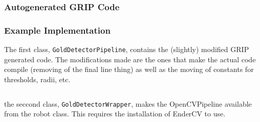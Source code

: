 \documentclass[../main.tex]{subfiles}
\begin{document}
\subsubsection{Autogenerated GRIP Code}
\subsubsection{Example Implementation}
The first class, \verb|GoldDetectorPipeline|, contains the (slightly) modified GRIP generated code. The modifications made are the ones that make the actual code compile (removing of the final line thing) as well as the moving of constants for thresholds, radii, etc.
\inputminted[linenos,breaklines,frame=lines,framesep=2mm,baselinestretch=1.2,fontsize=\footnotesize]{java}{sections/vision/code/GoldDetectorPipeline.java}

the seccond class, \verb|GoldDetectorWrapper|, makes the OpenCVPipeline available from the robot class. This requires the installation of EnderCV to use.
\inputminted[linenos,breaklines,frame=lines,framesep=2mm,baselinestretch=1.2,fontsize=\footnotesize]{java}{sections/vision/code/GoldDetectorWrapper.java}
\end{document}
